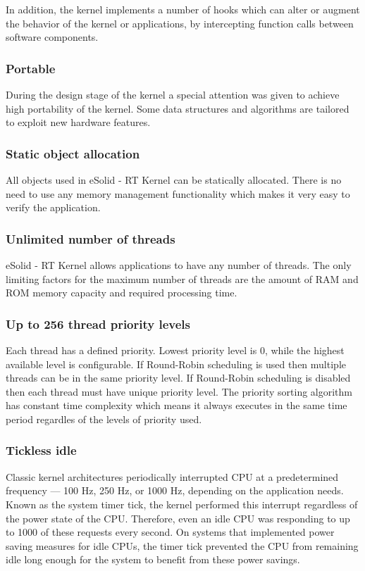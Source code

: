 In addition, the kernel implements a number of hooks which can alter or augment the behavior of the kernel or applications, by intercepting function calls between software components.\hypertarget{index_spec_portable}{}\subsubsection{Portable}\label{index_spec_portable}
During the design stage of the kernel a special attention was given to achieve high portability of the kernel. Some data structures and algorithms are tailored to exploit new hardware features.\hypertarget{index_spec_static}{}\subsubsection{Static object allocation}\label{index_spec_static}
All objects used in e\-Solid -\/ R\-T Kernel can be statically allocated. There is no need to use any memory management functionality which makes it very easy to verify the application.\hypertarget{index_spec_unlimited}{}\subsubsection{Unlimited number of threads}\label{index_spec_unlimited}
e\-Solid -\/ R\-T Kernel allows applications to have any number of threads. The only limiting factors for the maximum number of threads are the amount of R\-A\-M and R\-O\-M memory capacity and required processing time.\hypertarget{index_spec_prio}{}\subsubsection{Up to 256 thread priority levels}\label{index_spec_prio}
Each thread has a defined priority. Lowest priority level is 0, while the highest available level is configurable. If Round-\/\-Robin scheduling is used then multiple threads can be in the same priority level. If Round-\/\-Robin scheduling is disabled then each thread must have unique priority level. The priority sorting algorithm has constant time complexity which means it always executes in the same time period regardles of the levels of priority used.\hypertarget{index_spec_tickless}{}\subsubsection{Tickless idle}\label{index_spec_tickless}
Classic kernel architectures periodically interrupted C\-P\-U at a predetermined frequency — 100 Hz, 250 Hz, or 1000 Hz, depending on the application needs. Known as the system timer tick, the kernel performed this interrupt regardless of the power state of the C\-P\-U. Therefore, even an idle C\-P\-U was responding to up to 1000 of these requests every second. On systems that implemented power saving measures for idle C\-P\-Us, the timer tick prevented the C\-P\-U from remaining idle long enough for the system to benefit from these power savings.

